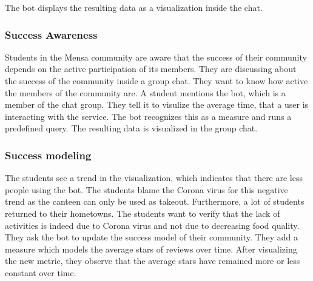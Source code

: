 The bot %
displays the  resulting data as a visualization inside the chat.

\subsubsection{Success Awareness} Students in the Mensa community are aware that the success of their community depends on the active participation of its members. They are discussing about the success of the community inside a group chat. They want to know how active the members of the community are. A student mentions the bot, which is a member of the chat group. They tell it to visulize the average time, that a user is interacting with the service. The bot recognizes this as a measure and runs a predefined query. The resulting data is visualized in the group chat.

\subsubsection{Success modeling} The students see a trend in the visualization, which indicates that there are less people using the bot.
The students blame the Corona virus for this negative trend as the canteen can only be used as takeout. Furthermore, a lot of students returned to their hometowns.
The students want to verify that the lack of activities is indeed due to Corona virus and not due to decreasing food quality.
They ask the bot to update the success model of their community.
They add a measure which models the average stars of reviews over time.
After visualizing the new metric, they observe that the average stars have remained more or less constant over time.




